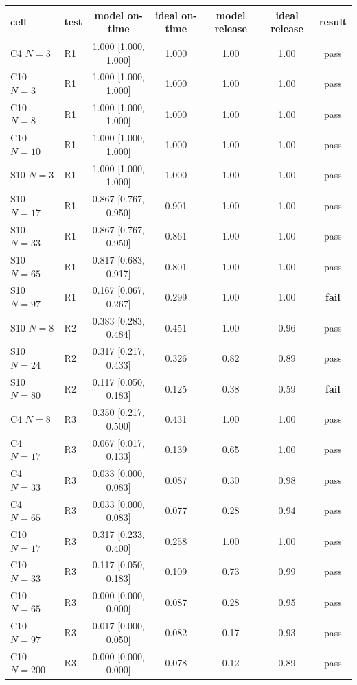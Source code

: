 \documentclass[11pt]{article}
\begin{document}
\begin{table}[h]
\centering\small
\begin{tabular}{llccccc}
\toprule
cell & test & model on-time & ideal on-time & model release & ideal release & result \\
\midrule
C4 $N{=}3$ & R1 & 1.000 [1.000, 1.000] & 1.000 & 1.00 & 1.00 & pass \\
C10 $N{=}3$ & R1 & 1.000 [1.000, 1.000] & 1.000 & 1.00 & 1.00 & pass \\
C10 $N{=}8$ & R1 & 1.000 [1.000, 1.000] & 1.000 & 1.00 & 1.00 & pass \\
C10 $N{=}10$ & R1 & 1.000 [1.000, 1.000] & 1.000 & 1.00 & 1.00 & pass \\
S10 $N{=}3$ & R1 & 1.000 [1.000, 1.000] & 1.000 & 1.00 & 1.00 & pass \\
S10 $N{=}17$ & R1 & 0.867 [0.767, 0.950] & 0.901 & 1.00 & 1.00 & pass \\
S10 $N{=}33$ & R1 & 0.867 [0.767, 0.950] & 0.861 & 1.00 & 1.00 & pass \\
S10 $N{=}65$ & R1 & 0.817 [0.683, 0.917] & 0.801 & 1.00 & 1.00 & pass \\
S10 $N{=}97$ & R1 & 0.167 [0.067, 0.267] & 0.299 & 1.00 & 1.00 & \textbf{fail} \\
\midrule
S10 $N{=}8$ & R2 & 0.383 [0.283, 0.484] & 0.451 & 1.00 & 0.96 & pass \\
S10 $N{=}24$ & R2 & 0.317 [0.217, 0.433] & 0.326 & 0.82 & 0.89 & pass \\
S10 $N{=}80$ & R2 & 0.117 [0.050, 0.183] & 0.125 & 0.38 & 0.59 & \textbf{fail} \\
\midrule
C4 $N{=}8$ & R3 & 0.350 [0.217, 0.500] & 0.431 & 1.00 & 1.00 & pass \\
C4 $N{=}17$ & R3 & 0.067 [0.017, 0.133] & 0.139 & 0.65 & 1.00 & pass \\
C4 $N{=}33$ & R3 & 0.033 [0.000, 0.083] & 0.087 & 0.30 & 0.98 & pass \\
C4 $N{=}65$ & R3 & 0.033 [0.000, 0.083] & 0.077 & 0.28 & 0.94 & pass \\
C10 $N{=}17$ & R3 & 0.317 [0.233, 0.400] & 0.258 & 1.00 & 1.00 & pass \\
C10 $N{=}33$ & R3 & 0.117 [0.050, 0.183] & 0.109 & 0.73 & 0.99 & pass \\
C10 $N{=}65$ & R3 & 0.000 [0.000, 0.000] & 0.087 & 0.28 & 0.95 & pass \\
C10 $N{=}97$ & R3 & 0.017 [0.000, 0.050] & 0.082 & 0.17 & 0.93 & pass \\
C10 $N{=}200$ & R3 & 0.000 [0.000, 0.000] & 0.078 & 0.12 & 0.89 & pass \\

\end{tabular}
\end{table}
\end{document}
